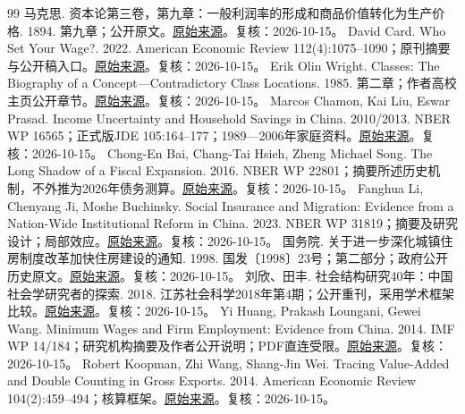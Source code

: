\documentclass[UTF8,fontset=fandol,zihao=-4,oneside,openany]{ctexbook}
\begin{document}
\begin{thebibliography}{99}
 马克思. 资本论第三卷，第九章：一般利润率的形成和商品价值转化为生产价格. 1894. 第九章；公开原文。\href{\detokenize{https://www.marxists.org/archive/marx/works/1894-c3/ch09.htm}}{原始来源}。复核：2026-10-15。
 David Card. Who Set Your Wage?. 2022. American Economic Review 112(4):1075–1090；原刊摘要与公开稿入口。\href{\detokenize{https://www.aeaweb.org/articles?id=10.1257/aer.112.4.1075}}{原始来源}。复核：2026-10-15。
 Erik Olin Wright. Classes: The Biography of a Concept—Contradictory Class Locations. 1985. 第二章；作者高校主页公开章节。\href{\detokenize{https://www.sscc.wisc.edu/soc/faculty/pages/wright/Published%20writing/classes-2.pdf}}{原始来源}。复核：2026-10-15。
 Marcos Chamon, Kai Liu, Eswar Prasad. Income Uncertainty and Household Savings in China. 2010/2013. NBER WP 16565；正式版JDE 105:164–177；1989—2006年家庭资料。\href{\detokenize{https://www.nber.org/papers/w16565}}{原始来源}。复核：2026-10-15。
 Chong-En Bai, Chang-Tai Hsieh, Zheng Michael Song. The Long Shadow of a Fiscal Expansion. 2016. NBER WP 22801；摘要所述历史机制，不外推为2026年债务测算。\href{\detokenize{https://www.nber.org/papers/w22801}}{原始来源}。复核：2026-10-15。
 Fanghua Li, Chenyang Ji, Moshe Buchinsky. Social Insurance and Migration: Evidence from a Nation-Wide Institutional Reform in China. 2023. NBER WP 31819；摘要及研究设计；局部效应。\href{\detokenize{https://www.nber.org/system/files/working_papers/w31819/w31819.pdf}}{原始来源}。复核：2026-10-15。
 国务院. 关于进一步深化城镇住房制度改革加快住房建设的通知. 1998. 国发〔1998〕23号；第二部分；政府公开历史原文。\href{\detokenize{https://www.beijing.gov.cn/zhengce/zhengcefagui/qtwj/201309/t20130924_776668.html}}{原始来源}。复核：2026-10-15。
 刘欣、田丰. 社会结构研究40年：中国社会学研究者的探索. 2018. 江苏社会科学2018年第4期；公开重刊，采用学术框架比较。\href{\detokenize{https://www.cssn.cn/skgz/202209/t20220916_5504623.shtml}}{原始来源}。复核：2026-10-15。
 Yi Huang, Prakash Loungani, Gewei Wang. Minimum Wages and Firm Employment: Evidence from China. 2014. IMF WP 14/184；研究机构摘要及作者公开说明；PDF直连受限。\href{\detokenize{https://www.imf.org/external/pubs/ft/wp/2014/wp14184.pdf}}{原始来源}。复核：2026-10-15。
 Robert Koopman, Zhi Wang, Shang-Jin Wei. Tracing Value-Added and Double Counting in Gross Exports. 2014. American Economic Review 104(2):459–494；核算框架。\href{\detokenize{https://pubs.aeaweb.org/doi/abs/10.1257/aer.104.2.459}}{原始来源}。复核：2026-10-15。

\end{thebibliography}
\end{document}
